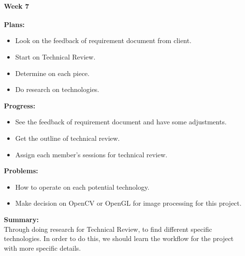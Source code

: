 \paragraph{Week 7}
\begin{adjustwidth}{2.5em}{0pt}
    \vspace{-0.5cm}\textbf{Plans:}
    \vspace{-0.5cm}
    \begin{itemize}
        \item Look on the feedback of requirement document from client.
        \item Start on Technical Review.
            \item Determine on each piece.
            \item Do research on technologies.
    \end{itemize} 
    \vspace{-0.3cm}\textbf{Progress:}
    \vspace{-0.5cm}
    \begin{itemize}
        \item See the feedback of requirement document and have some adjustments.
        \item Get the outline of technical review.
        \item Assign each member's sessions for technical review.
    \end{itemize} 
    \vspace{-0.3cm}\textbf{Problems:}
    \vspace{-0.5cm}
    \begin{itemize}
        \item How to operate on each potential technology.
        \item Make decision on OpenCV or OpenGL for image processing for this project.
    \end{itemize}  
    \vspace{-0.3cm}\noindent\textbf{Summary:}\\
    \noindent Through doing research for Technical Review, to find different specific technologies. In 
    order to do this, we should learn the workflow for the project with more specific details. \\
\end{adjustwidth} 

